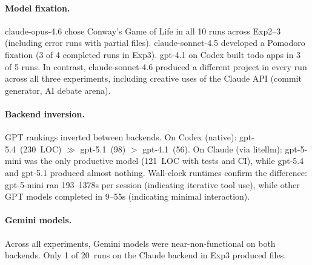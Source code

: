 \documentclass{article}
\begin{document}
\begin{table}[t]
\caption{Experiment~3: Codex backend, GPT models (files not
persisted to host due to bwrap isolation).}
\label{tab:exp3_codex}
\small{}
\end{table}

\paragraph{Model fixation.}
claude-opus-4.6 chose Conway's Game of Life in all 10 runs
across Exp2--3 (including error runs with partial files).
claude-sonnet-4.5 developed a Pomodoro fixation (3 of 4 completed
runs in Exp3). gpt-4.1 on Codex built todo apps in 3 of 5 runs.
In contrast, claude-sonnet-4.6 produced a different project in
every run across all three experiments, including creative uses
of the Claude API (commit generator, AI debate arena).

\paragraph{Backend inversion.}
GPT rankings inverted between backends. On Codex (native):
gpt-5.4~(230~LOC) $\gg$ gpt-5.1~(98) $>$ gpt-4.1~(56).
On Claude (via litellm): gpt-5-mini was the only productive model
(121~LOC with tests and CI), while gpt-5.4 and gpt-5.1
produced almost nothing. Wall-clock runtimes confirm the
difference: gpt-5-mini ran 193--1378s per session (indicating
iterative tool use), while other GPT models completed in 9--55s
(indicating minimal interaction).

\paragraph{Gemini models.}
Across all experiments, Gemini models were near-non-functional on
both backends. Only 1 of 20~runs on the Claude backend in Exp3
produced files.
\end{document}
